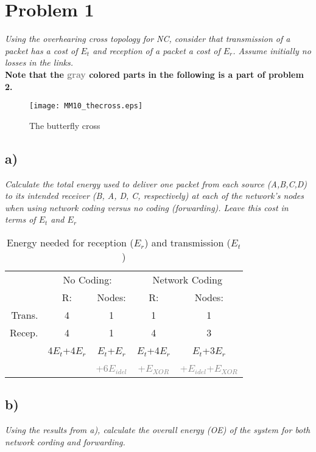 \section{Problem 1}
\textit{Using the overhearing cross topology for NC, consider that transmission of a packet has a cost of $E_t$ and reception of a packet a cost of $E_r$. Assume initially no losses in the links.}\\


\textbf{Note that the \textcolor{gray}{gray} colored parts in the following is a part of problem 2.}

\begin{figure}[h!]
  \centering
  \texttt{[image: MM10\_thecross.eps]}
  \caption{The butterfly cross}
  \label{fig:MM12_thecross}
\end{figure}
\FloatBarrier

\subsection{a)} 
\textit{Calculate the total energy used to deliver one packet from each source (A,B,C,D) to its intended receiver (B, A, D, C, respectively) at each of the network's nodes when using network coding versus no coding (forwarding). Leave this cost in terms of $E_t$ and $E_r$}

\begin{table}[h!]
  \centering
  \begin{tabular}{|r|c|c|c|c|}
    \hline
          & \multicolumn{2}{c|}{No Coding:} & \multicolumn{2}{c|}{Network Coding} \\
          & R:    & Nodes: & R:    & Nodes: \\ \hline
    Trans. & 4     & 1     & 1     & 1 \\
    Recep. & 4     & 1     & 4     & 3 \\    \hline
          & 4$E_t$+4$E_r$ & $E_t$+$E_r$ & $E_t$+4$E_r$ & $E_t$+3$E_r$ \\
          &			& \textcolor{gray}{+6$E_{idel}$}& \textcolor{gray}{+$E_{XOR}$} & \textcolor{gray}{+$E_{idel}$+$E_{XOR}$} \\	
    \hline
  \end{tabular}%
  \caption{Energy needed for reception ($E_r$) and transmission ($E_t$)} \label{tab:addlabel}%
\end{table}%

\FloatBarrier
\subsection{b)} 
\textit{Using the results from a), calculate the overall energy (OE) of the system for both network cording and forwarding.}\\
 
